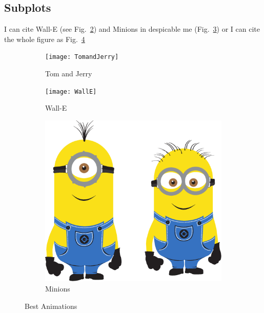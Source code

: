 \begin{landscape}

\section*{Subplots}
I can cite Wall-E (see Fig.~\ref{fig:WallE}) and Minions in despicable me (Fig.~\ref{fig:Minnion}) or I can cite the whole figure as Fig.~\ref{fig:animations}


\begin{figure}
  \centering
  \begin{subfigure}[b]{0.3\textwidth}
    \texttt{[image: TomandJerry]}
    \caption{Tom and Jerry}
    \label{fig:TomJerry}   
  \end{subfigure}             
  \begin{subfigure}[b]{0.3\textwidth}
    \texttt{[image: WallE]}
    \caption{Wall-E}
    \label{fig:WallE}
  \end{subfigure}             
  \begin{subfigure}[b]{0.3\textwidth}
    \includegraphics[width=\textwidth]{minion}
    \caption{Minions}
    \label{fig:Minnion}
  \end{subfigure}
  \caption{Best Animations}
  \label{fig:animations}
\end{figure}


\end{landscape}
